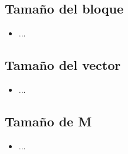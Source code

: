 \subsection{Tamaño del bloque}
\begin{itemize}
	\item ...
\end{itemize}

\subsection{Tamaño del vector}
\begin{itemize}
	\item ...
\end{itemize}

\subsection{Tamaño de M}
\begin{itemize}
	\item ...
\end{itemize}
